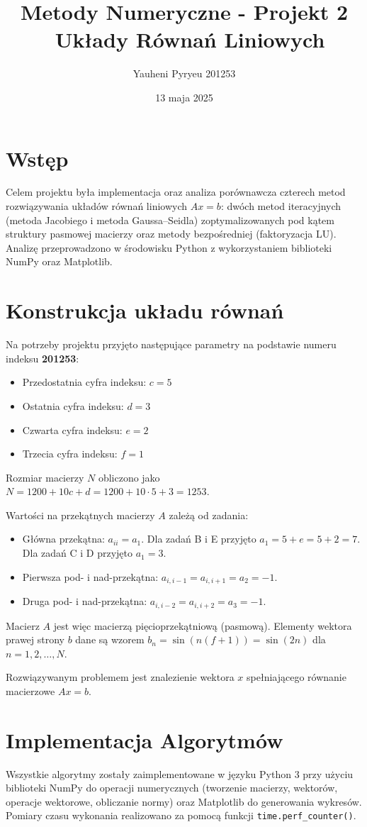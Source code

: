 \documentclass[a4paper, 11pt]{article}
\title{Metody Numeryczne - Projekt 2 \ Układy Równań Liniowych}
\author{Yauheni Pyryeu 201253}
\date{13 maja 2025}
\begin{document}
\maketitle

\section{Wstęp}
Celem projektu była implementacja oraz analiza porównawcza czterech metod rozwiązywania układów równań liniowych $Ax = b$: dwóch metod iteracyjnych (metoda Jacobiego i metoda Gaussa–Seidla) zoptymalizowanych pod kątem struktury pasmowej macierzy oraz metody bezpośredniej (faktoryzacja LU). Analizę przeprowadzono w środowisku Python z wykorzystaniem biblioteki NumPy oraz Matplotlib.

\section{Konstrukcja układu równań}
Na potrzeby projektu przyjęto następujące parametry na podstawie numeru indeksu \textbf{201253}:
\begin{itemize}
    \item Przedostatnia cyfra indeksu: $c = 5$
    \item Ostatnia cyfra indeksu: $d = 3$
    \item Czwarta cyfra indeksu: $e = 2$
    \item Trzecia cyfra indeksu: $f = 1$
\end{itemize}
Rozmiar macierzy $N$ obliczono jako $N = 1200 + 10c + d = 1200 + 10 \cdot 5 + 3 = 1253$.

Wartości na przekątnych macierzy $A$ zależą od zadania:
\begin{itemize}
    \item Główna przekątna: $a_{ii} = a_1$. Dla zadań B i E przyjęto $a_1 = 5 + e = 5 + 2 = 7$. Dla zadań C i D przyjęto $a_1 = 3$.
    \item Pierwsza pod- i nad-przekątna: $a_{i, i-1} = a_{i, i+1} = a_2 = -1$.
    \item Druga pod- i nad-przekątna: $a_{i, i-2} = a_{i, i+2} = a_3 = -1$.
\end{itemize}
Macierz $A$ jest więc macierzą pięcioprzekątniową (pasmową). Elementy wektora prawej strony $b$ dane są wzorem $b_n = \sin(n(f+1)) = \sin(2n)$ dla $n = 1, 2, \dots, N$.

Rozwiązywanym problemem jest znalezienie wektora $x$ spełniającego równanie macierzowe $Ax = b$.

\section{Implementacja Algorytmów}
Wszystkie algorytmy zostały zaimplementowane w języku Python 3 przy użyciu biblioteki NumPy do operacji numerycznych (tworzenie macierzy, wektorów, operacje wektorowe, obliczanie normy) oraz Matplotlib do generowania wykresów. Pomiary czasu wykonania realizowano za pomocą funkcji \texttt{time.perf\_counter()}.
\end{document}
